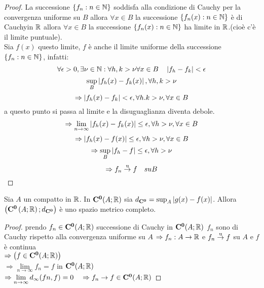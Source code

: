 \begin{proof}
	La successione $\left\{ f_n:n\in\mathbb{N}\right\}$ soddisfa alla condizione di Cauchy per la convergenza uniforme su $B$ allora $\forall x\in B$ la successione $\left\{ f_n(x) :n\in\mathbb{N} \right\}$ è di Cauchyin $ \mathbb{R}$ allora $\forall x \in B$ la successione $\left\{ f_n(x):n\in\mathbb{N} \right\}$ ha limite in $ \mathbb{R}$.(cioè c'è il limite puntuale).\\
	Sia $f(x)$ questo limite, $f$ è anche il limite uniforme della successione $\left\{ f_n:n\in\mathbb{N} \right\}$, infatti:
	$$\forall\epsilon>0, \exists\nu\in\mathbb{N}: \forall h,k>\nu \forall x\in B \quad \left|f_h-f_k\right|<\epsilon$$
	$$\sup\limits_B\left|f_h(x)-f_k(x)\right|, \forall h,k>\nu$$
	$$\Rightarrow \left|f_h(x)-f_k\right|<\epsilon,\forall h.k>\nu, \forall x \in B$$
	a questo punto si passa al limite e la disuguaglianza diventa debole.
	$$\Rightarrow \lim\limits_{n\to\infty}\left|f_h(x)-f_k(x)\right|\le\epsilon, \forall h>\nu, \forall x\in B$$
	$$\Rightarrow\left|f_h(x)-f(x)\right|\le\epsilon, \forall h>\nu, \forall x\in B$$
	$$\Rightarrow\sup\limits_B\left|f_h-f\right|\le\epsilon, \forall h>\nu$$
	$$\Rightarrow f_n \overset{\text{u}}{\to} f\quad su B$$
\end{proof}
\begin{proposition}
	Sia $A$ un compatto in $ \mathbb{R}$. In $\mathbf{C^{0}}(A; \mathbb{R})$ sia $d_{\mathbf{C^{0}}}=\sup_A\left|g(x)-f(x)\right|$. Allora $\left( \mathbf{C^{0}}\left(A; \mathbb{R}\right);d_{\mathbf{C^{0}}}\right)$ è uno spazio metrico completo.
	\begin{proof}
		prendo $f_n\in \mathbf{C^{0}}(A; \mathbb{R})$ successione di Cauchy in $\mathbf{C^{0}}(A; \mathbb{R})$
		$f_n$ sono di Cauchy rispetto alla convergenza uniforme su $A$
		$\Rightarrow f_n:A\to \mathbb{R}$ e $f_n \overset{\text{u}}{\to} f$ su $A$ e $f$ è continua\\ $\Rightarrow\left(f\in \mathbf{C^{0}}(A; \mathbb{R})\right)$\\
		$\Rightarrow\lim\limits_{n\to\infty}f_n=f$ in $\mathbf{C^{0}}(A; \mathbb{R})$\\
		$\Rightarrow\lim\limits_{n\to\infty}d_{\infty}(fn,f)=0\quad\Rightarrow f_n\to f\in \mathbf{C^{0}}(A; \mathbb{R})$
	\end{proof}
\end{proposition}
\begin{corollary} %
	\label{prop:compl_dist_spm_compl}
\end{corollary}

